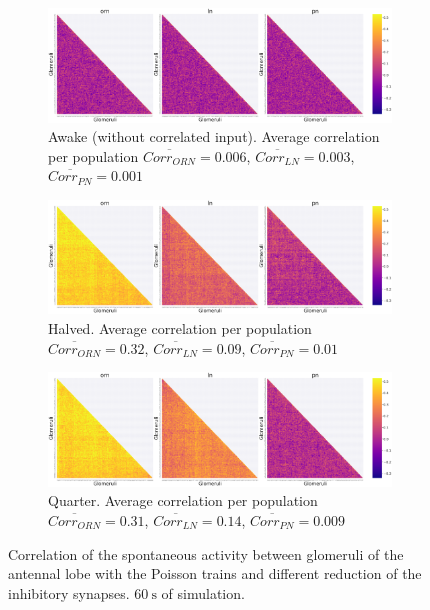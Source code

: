 \begin{figure}
  \begin{subfigure}[t]{\textwidth}
    \centering
    \includegraphics[width=\textwidth]{correlation-awake-no-poisson}
    \caption{Awake (without correlated input). Average correlation per population $\overline{Corr_{ORN}} = 0.006$, $\overline{Corr_{LN}} = 0.003$, $\overline{Corr_{PN}} = 0.001$}
    \label{fig:correlation-awake-poisson-finding-asleep}
  \end{subfigure}
  \begin{subfigure}[t]{\textwidth}
    \centering
    \includegraphics[width=\textwidth]{correlation-halved-poisson}
    \caption{Halved. Average correlation per population $\overline{Corr_{ORN}} = 0.32$, $\overline{Corr_{LN}} = 0.09$, $\overline{Corr_{PN}} = 0.01$}
    \label{fig:correlation-halved-poisson-finding-asleep}
  \end{subfigure}
  \begin{subfigure}[t]{\textwidth}
    \centering
    \includegraphics[width=\textwidth]{correlation-quarter-poisson}
    \caption{Quarter. Average correlation per population $\overline{Corr_{ORN}} = 0.31$, $\overline{Corr_{LN}} = 0.14$, $\overline{Corr_{PN}} = 0.009$}
    \label{fig:correlation-quarter-poisson-finding-asleep}
  \end{subfigure}
  \caption{Correlation of the spontaneous activity between glomeruli of the antennal lobe with the Poisson trains and different reduction of the inhibitory synapses. $\SI{60}{\second}$ of simulation.}
  \label{fig:correlation-finding-asleep-1}
\end{figure}

